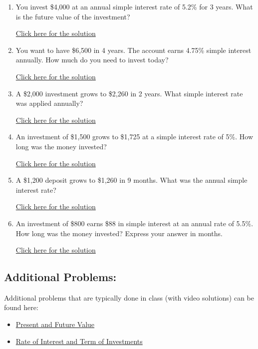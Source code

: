 \documentclass[
]{book}
\providecommand{\tightlist}{%
  \setlength{\itemsep}{0pt}\setlength{\parskip}{0pt}}
\begin{document}
\begin{enumerate}
\def\labelenumi{\arabic{enumi}.}
\tightlist
\item
  You invest \$4,000 at an annual simple interest rate of 5.2\% for 3 years. What is the future value of the investment?

  \href{https://youtu.be/ooJiLig1RI8}{Click here for the solution}
\item
  You want to have \$6,500 in 4 years. The account earns 4.75\% simple interest annually. How much do you need to invest today?

  \href{https://youtu.be/qZ7aX93LZbE}{Click here for the solution}
\item
  A \$2,000 investment grows to \$2,260 in 2 years. What simple interest rate was applied annually?

  \href{https://youtu.be/QhSdkW94xBM}{Click here for the solution}
\item
  An investment of \$1,500 grows to \$1,725 at a simple interest rate of 5\%. How long was the money invested?

  \href{https://youtu.be/fTSXKSAGclc}{Click here for the solution}
\item
  A \$1,200 deposit grows to \$1,260 in 9 months. What was the annual simple interest rate?

  \href{https://youtu.be/R5s-Mz-ZkIc}{Click here for the solution}
\item
  An investment of \$800 earns \$88 in simple interest at an annual rate of 5.5\%. How long was the money invested? Express your answer in months.

  \href{https://youtu.be/GwhT6TUKA1Y}{Click here for the solution}
\end{enumerate}

\subsection*{Additional Problems:}\label{additional-problems-7}

Additional problems that are typically done in class (with video solutions) can be found here:

\begin{itemize}
\item
  \href{https://theelementsmath.github.io/M114/simple-interest.html\#present-and-future-value}{Present and Future Value}
\item
  \href{https://theelementsmath.github.io/M114/simple-interest.html\#rate-of-interest-and-term-of-investments}{Rate of Interest and Term of Investments}
\end{itemize}
\end{document}

